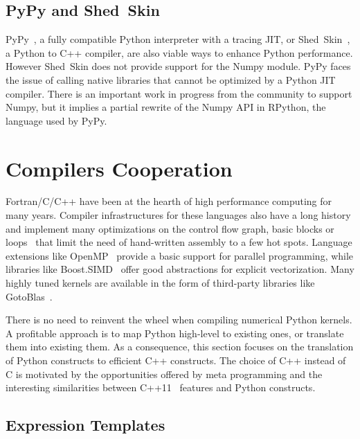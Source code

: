 \documentclass[10pt, preprint]{sigplanconf}
\begin{document}
\subsection{PyPy and Shed~Skin}

PyPy~\cite{pypy2009}, a fully compatible Python interpreter with a tracing JIT,
or Shed~Skin~\cite{shedskin2006}, a Python to C++ compiler, are also viable
ways to enhance Python performance. However Shed~Skin does not provide support
for the Numpy module. PyPy faces the issue of calling native libraries that
cannot be optimized by a Python JIT compiler. There is an important work in
progress from the community to support Numpy, but it implies a partial rewrite
of the Numpy API in RPython, the language used by PyPy.



\section{Compilers Cooperation}
\label{sec:pythran}

Fortran/C/C++ have been at the hearth of high performance computing for many years.
Compiler infrastructures for these languages also have a long history and
implement many optimizations on the control flow graph, basic blocks or
loops~\cite{Aho2006} that limit the need of hand-written assembly to a few hot 
spots.
Language extensions like OpenMP~\cite{openmp4} provide a basic support for 
parallel programming, while libraries like Boost.SIMD~\cite{esterie2012boost} 
offer good abstractions for explicit vectorization. Many highly tuned kernels 
are available in the form of third-party libraries like 
GotoBlas~\cite{gotoblas2008}.

There is no need to reinvent the wheel when compiling numerical Python kernels.
A profitable approach is to map Python high-level to existing ones, or
translate them into existing them.
As a consequence, this section focuses on
the translation of Python constructs to efficient C++ constructs. The choice of
C++ instead of C is motivated by the opportunities offered by meta programming
and the interesting similarities between C++11~\cite{isocxx11} features and
Python constructs.

\subsection{Expression Templates}
\label{sec:expression-templates}
\end{document}
